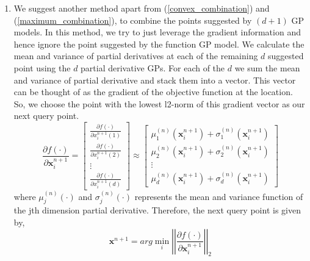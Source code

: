 \documentclass{article}
\begin{document}
\begin{enumerate}
        \item
            We suggest another method apart from (\ref{convex_combination}) and (\ref{maximum_combination}), to combine the points suggested by $(d+1)$ GP 
            models. In this method, we try to just leverage the gradient information and hence ignore the point suggested by the function GP model. We 
            calculate the mean and variance of partial derivatives at each of the remaining $d$ suggested point using the $d$ partial derivative GPs. For each
            of the $d$ we sum the mean and variance of partial derivative and stack them into a vector. This vector can be thought of as the gradient of the 
            objective function at the location. So, we choose the point with the lowest l2-norm of this gradient vector as our next query point. 
            \begin{equation}
                \frac {\partial f(\cdot)}{\partial \textbf{x}_{i}^{n+1}} = \begin{bmatrix}
                    \frac{\partial f(\cdot)}{\partial x_{i}^{n+1}(1)} \\
                    \frac{\partial f(\cdot)}{\partial x_{i}^{n+1}(2)} \\
                    \vdots \\
                    \frac{\partial f(\cdot)}{\partial x_{i}^{n+1}(d)}
                \end{bmatrix} \approx \begin{bmatrix}
                    \mu^{(n)}_{1}(\textbf{x}_{i}^{n+1}) + \sigma^{(n)}_{1}(\textbf{x}_{i}^{n+1}) \\
                    \mu^{(n)}_{2}(\textbf{x}_{i}^{n+1}) + \sigma^{(n)}_{2}(\textbf{x}_{i}^{n+1}) \\
                    \vdots \\
                    \mu^{(n)}_{d}(\textbf{x}_{i}^{n+1}) + \sigma^{(n)}_{d}(\textbf{x}_{i}^{n+1})
                \end{bmatrix}
            \end{equation}
            where $\mu^{(n)}_{j}(\cdot)$ and $\sigma^{(n)}_{j}(\cdot)$ represents the mean and variance function of the jth dimension partial derivative.
            Therefore, the next query point is given by,
            \begin{equation}
                \textbf{x}^{n+1} = arg \min_{i} \left | \left | \frac {\partial f(\cdot)}{\partial \textbf{x}_{i}^{n+1}} \right | \right |_2
            \end{equation}


\end{enumerate}
\end{document}

